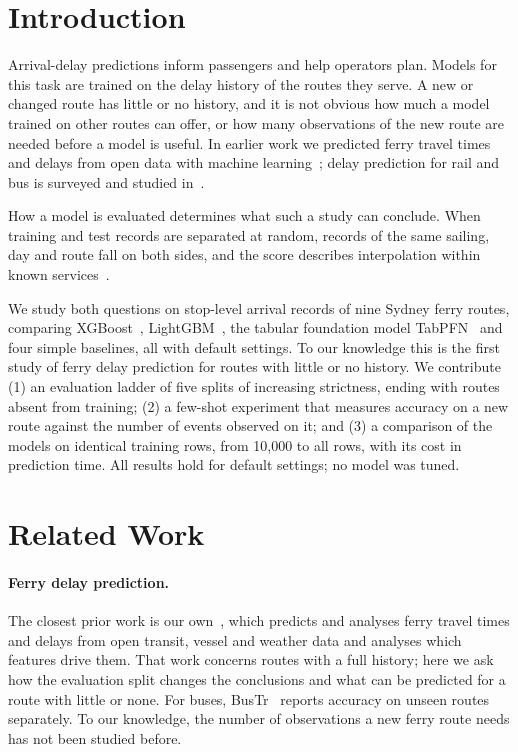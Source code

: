 \documentclass[runningheads]{llncs}
\begin{document}
\section{Introduction}
Arrival-delay predictions inform passengers and help operators plan. Models
for this task are trained on the delay history of the routes they serve. A new
or changed route has little or no history, and it is not obvious how much a
model trained on other routes can offer, or how many observations of the new
route are needed before a model is useful. In earlier work we predicted ferry
travel times and delays from open data with machine
learning~\cite{sarhani2023ferries,sarhani2025ferry}; delay prediction for
rail and bus is surveyed and studied
in~\cite{tiong2023review,czerepicki2026bus}.

How a model is evaluated determines what such a study can conclude. When
training and test records are separated at random, records of the same
sailing, day and route fall on both sides, and the score describes
interpolation within known services~\cite{kaufman2012leakage,kapoor2023leakage,roberts2017crossvalidation}.

We study both questions on stop-level arrival records of nine Sydney ferry
routes, comparing XGBoost~\cite{chen2016xgboost},
LightGBM~\cite{ke2017lightgbm}, the tabular foundation model
TabPFN~\cite{hollmann2025tabpfn,jaeger2026tabpfn35} and four simple
baselines, all with default settings. To our knowledge this is the first
study of ferry delay prediction for routes with little or no history. We
contribute (1) an evaluation ladder of five splits of increasing strictness,
ending with routes absent from training; (2) a few-shot experiment that
measures accuracy on a new route against the number of events observed on
it; and (3) a comparison of the models on identical training rows, from
10{,}000 to all rows, with its cost in prediction time. All results
hold for default settings; no model was tuned.

\section{Related Work}
\paragraph{Ferry delay prediction.}
The closest prior work is our
own~\cite{sarhani2023ferries,sarhani2025ferry}, which predicts and analyses
ferry travel times and delays from open transit, vessel and weather data and
analyses which features drive them. That work concerns routes with a full
history; here we ask how the evaluation split changes the conclusions and
what can be predicted for a route with little or none. For buses,
BusTr~\cite{barnes2020bustr} reports accuracy on unseen routes separately.
To our knowledge, the number of observations a new ferry route needs has
not been studied before.
\end{document}
